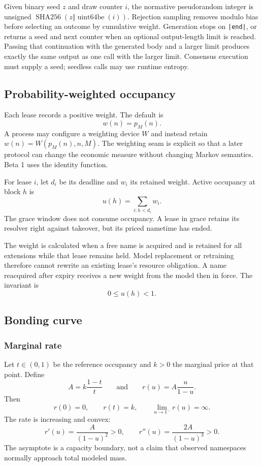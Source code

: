 \documentclass[10pt,twocolumn]{article}
\newcommand{\key}[1]{\texttt{#1}}
\begin{document}
Given binary seed $z$ and draw counter $i$, the normative pseudorandom integer
is unsigned $\operatorname{SHA256}(z\mathbin\Vert\operatorname{uint64be}(i))$.
Rejection sampling removes modulo bias before selecting an outcome by cumulative
weight. Generation stops on \key{|end|}, or returns a seed and next counter when
an optional output-length limit is reached. Passing that continuation with the
generated body and a larger limit produces exactly the same output as one call
with the larger limit. Consensus execution must supply a seed; seedless calls
may use runtime entropy.

\subsection{Probability-weighted occupancy}

Each lease records a positive weight. The default is
\[
  w(n)=p_M(n).
\]
A process may configure a weighting device $W$ and instead retain
$w(n)=W(p_M(n),n,M)$. The weighting seam is explicit so that a later protocol
can change the economic measure without changing Markov semantics. Beta 1 uses
the identity function.

For lease $i$, let $d_i$ be its deadline and $w_i$ its retained weight. Active
occupancy at block $h$ is
\[
  u(h)=\sum_{i:h<d_i}w_i.
\]
The grace window does not consume occupancy. A lease in grace retains its
resolver right against takeover, but its priced nametime has ended.

The weight is calculated when a free name is acquired and is retained for all
extensions while that lease remains held. Model replacement or retraining
therefore cannot rewrite an existing lease's resource obligation. A name
reacquired after expiry receives a new weight from the model then in force.
The invariant is
\[
  0\leq u(h)<1.
\]

\subsection{Bonding curve}

\subsubsection{Marginal rate}

Let $t\in(0,1)$ be the reference occupancy and $k>0$ the marginal price at
that point. Define
\[
  A=k\frac{1-t}{t}
  \qquad\text{and}\qquad
  r(u)=A\frac{u}{1-u}.
\]
Then
\[
  r(0)=0,\qquad r(t)=k,\qquad
  \lim_{u\to1^-}r(u)=\infty.
\]
The rate is increasing and convex:
\[
  r'(u)=\frac{A}{(1-u)^2}>0,
  \qquad
  r''(u)=\frac{2A}{(1-u)^3}>0.
\]
The asymptote is a capacity boundary, not a claim that observed namespaces
normally approach total modeled mass.
\end{document}
